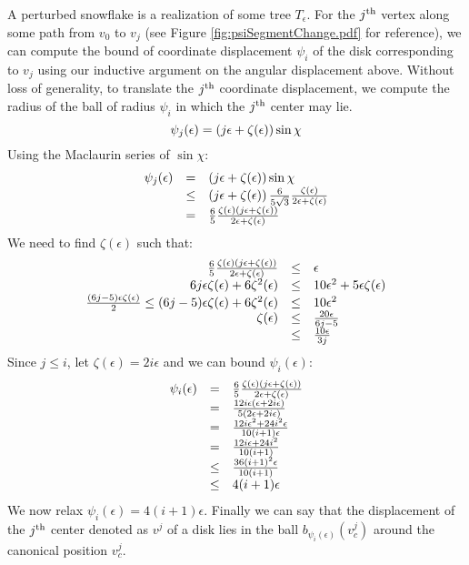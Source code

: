 A perturbed snowflake is a realization of some tree $T_\epsilon$.  
For the $j^\text{th}$ vertex along some path from $v_0$ to $v_j$ (see Figure \ref{fig:psiSegmentChange.pdf} for reference), we can compute the bound of coordinate displacement $\psi_i$ of the disk corresponding to $v_j$ using our inductive argument on the angular displacement above.  
Without loss of generality, to translate the $j^\text{th}$ coordinate displacement, we compute the radius of the ball of radius $\psi_i$ in which the $j^\text{th}$ center may lie. 
$$\psi_j(\epsilon) = \left( j \epsilon + \zeta(\epsilon) \right) \sin \chi$$
Using the Maclaurin series of $\sin \chi$:
$$
\begin{array}{rcl}
\psi_j(\epsilon) &=& \left( j \epsilon + \zeta(\epsilon) \right) \sin \chi\\
&\leq& \left( j \epsilon + \zeta(\epsilon) \right) \frac{6}{5 \sqrt{3}}\frac{\zeta(\epsilon)}{ 2\epsilon + \zeta(\epsilon)} \\
&=& \frac{6}{5}\frac{\zeta(\epsilon)\left( j \epsilon + \zeta(\epsilon) \right)}{2 \epsilon + \zeta(\epsilon)}\\
\end{array}
$$
We need to find $\zeta(\epsilon)$ such that:
$$ 
\begin{array}{rcl}
\frac{6}{5}\frac{\zeta(\epsilon)\left( j \epsilon + \zeta(\epsilon) \right)}{2 \epsilon + \zeta(\epsilon)} &\leq& \epsilon\\
6j\epsilon \zeta(\epsilon) + 6 \zeta^2 (\epsilon) &\leq& 10 \epsilon^2 + 5 \epsilon \zeta(\epsilon)\\
\frac{(6j-5) \epsilon \zeta(\epsilon)}{2}\leq (6j-5)\epsilon \zeta(\epsilon) + 6 \zeta^2 (\epsilon) &\leq& 10 \epsilon^2 \\
\zeta(\epsilon)&\leq& \frac{20\epsilon}{6j-5}\\
&\leq& \frac{10 \epsilon}{3j}
\end{array}
$$
Since $j\leq i$, let $\zeta(\epsilon)= 2i\epsilon$ and we can bound $\psi_i(\epsilon)$:
$$
\begin{array}{rcl}
\psi_i(\epsilon) &=& \frac{6}{5}\frac{\zeta(\epsilon)\left( j \epsilon + \zeta(\epsilon) \right)}{2 \epsilon + \zeta(\epsilon)}\\
&=& \frac{12 i\epsilon \left(  \epsilon + 2i\epsilon \right)}{5\left( 2 \epsilon + 2i\epsilon \right)}\\
&=&\frac{12 i \epsilon^2 + 24 i^2 \epsilon }{10 (i+1) \epsilon}\\
&=&\frac{12i\epsilon + 24i^2}{10(i+1)}\\
&\leq& \frac{36(i+1)^2 \epsilon}{10(i+1)}\\
&\leq& 4(i+1)\epsilon
\end{array}
$$
We now relax $\psi_i(\epsilon) = 4(i+1)\epsilon$. Finally we can say that the displacement of the $j^\text{th}$ center denoted as $v^j$ of a disk lies in the ball $b_{\psi_i(\epsilon)}(v^j_c)$ around the canonical position $v_c^j$.

